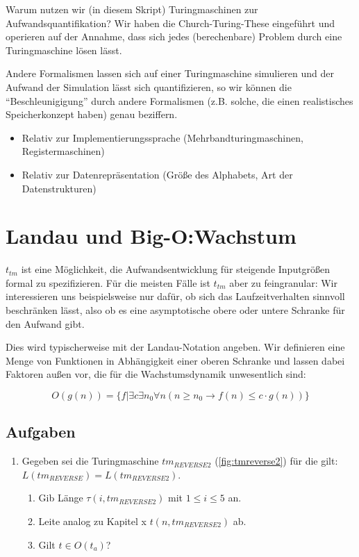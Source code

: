 Warum nutzen wir (in diesem Skript) Turingmaschinen zur Aufwandsquantifikation?
Wir haben die Church-Turing-These eingeführt und operieren auf der Annahme,
dass sich jedes (berechenbare) Problem durch eine Turingmaschine lösen lässt.

Andere Formalismen lassen sich auf einer Turingmaschine simulieren und
der Aufwand der Simulation lässt sich quantifizieren,
so wir können die ``Beschleunigigung'' durch andere Formalismen
(z.B. solche, die einen realistisches Speicherkonzept haben)
genau beziffern.

\begin{itemize}
    \item Relativ zur Implementierungssprache (Mehrbandturingmaschinen, Registermaschinen)
    \item Relativ zur Datenrepräsentation (Größe des Alphabets, Art der Datenstrukturen)
\end{itemize}

\section{Landau und Big-O:\@ Wachstum}

$t_{tm}$ ist eine Möglichkeit,
die Aufwandsentwicklung für steigende Inputgrößen formal zu spezifizieren.
Für die meisten Fälle ist $t_{tm}$ aber zu feingranular:
Wir interessieren uns beispielsweise nur dafür,
ob sich das Laufzeitverhalten sinnvoll beschränken lässt,
also ob es eine asymptotische obere oder untere Schranke für den Aufwand gibt.

Dies wird typischerweise mit der Landau-Notation angeben.
Wir definieren eine Menge von Funktionen in Abhängigkeit einer oberen Schranke
und lassen dabei Faktoren außen vor,
die für die Wachstumsdynamik unwesentlich sind:

\[
O(g(n)) = \{f|\exists c \exists n_0 \forall n (n \geq n_0 \rightarrow f(n) \leq c \cdot g(n))\}
\]

\subsection*{Aufgaben}

\begin{enumerate}
    \item Gegeben sei die Turingmaschine $tm_{REVERSE2}$ (\autoref{fig:tmreverse2}) für die gilt: $L(tm_{REVERSE}) = L(tm_{REVERSE2})$.
            \begin{enumerate}
                \item Gib Länge $\tau(i, tm_{REVERSE2})$ mit $1 \leq i \leq 5$ an.
                \item Leite analog zu Kapitel x $t(n, tm_{REVERSE2})$ ab.
                \item Gilt $t \in O(t_{a})$?
            \end{enumerate}
\end{enumerate}

